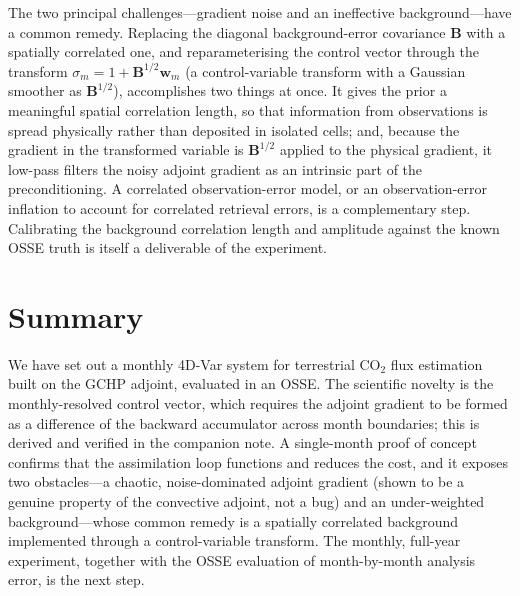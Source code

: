 \documentclass[12pt]{article}
\newcommand{\bm}[1]{\mathbf{#1}}
\begin{document}
The two principal challenges---gradient noise and an ineffective background---have
a common remedy. Replacing the diagonal background-error covariance $\bm{B}$ with
a spatially correlated one, and reparameterising the control vector through the
transform $\sigma_m = 1 + \bm{B}^{1/2}\bm{w}_m$ (a control-variable transform with
a Gaussian smoother as $\bm{B}^{1/2}$), accomplishes two things at once. It gives
the prior a meaningful spatial correlation length, so that information from
observations is spread physically rather than deposited in isolated cells; and,
because the gradient in the transformed variable is $\bm{B}^{1/2}$ applied to the
physical gradient, it low-pass filters the noisy adjoint gradient as an intrinsic
part of the preconditioning. A correlated observation-error model, or an
observation-error inflation to account for correlated retrieval errors, is a
complementary step. Calibrating the background correlation length and amplitude
against the known OSSE truth is itself a deliverable of the experiment.

\section{Summary}

We have set out a monthly 4D-Var system for terrestrial CO$_2$ flux estimation
built on the GCHP adjoint, evaluated in an OSSE. The scientific novelty is the
monthly-resolved control vector, which requires the adjoint gradient to be formed
as a difference of the backward accumulator across month boundaries; this is
derived and verified in the companion note. A single-month proof of concept
confirms that the assimilation loop functions and reduces the cost, and it
exposes two obstacles---a chaotic, noise-dominated adjoint gradient (shown to be
a genuine property of the convective adjoint, not a bug) and an under-weighted
background---whose common remedy is a spatially correlated background implemented
through a control-variable transform. The monthly, full-year experiment, together
with the OSSE evaluation of month-by-month analysis error, is the next step.
\end{document}
